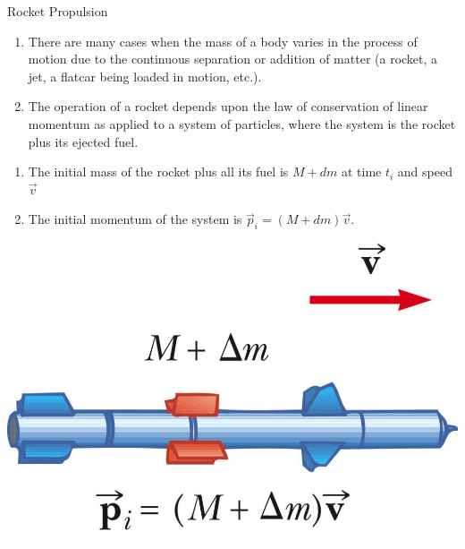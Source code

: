 \documentclass[18pt]{LectMechanics}
\begin{document}
\begin{frame}{Rocket Propulsion}{}
	\begin{enumerate}
		\item There are many cases when the mass of a body varies in
		      the process of motion due to the continuous separation or
		      addition of matter (a rocket, a jet, a flatcar being loaded
		      in motion, etc.).
		\item The operation of a rocket depends upon the law of
		      conservation of linear momentum as applied to a
		      system of particles, where the system is the rocket plus
		      its ejected fuel.
	\end{enumerate}
	\begin{minipage}{0.5\linewidth}
		\begin{enumerate}
			\item 	The initial mass of the rocket plus all its fuel is $M + d m$ at time $t_i$
			      and speed $\vec v$
			\item The initial momentum of 	the system is $\vec p_i = (M + d m) \vec v$.
		\end{enumerate}
	\end{minipage}
	\begin{minipage}{0.4\linewidth}
		\includegraphics[width=\linewidth]{Rocket1}
	\end{minipage}
\end{frame}
\end{document}
